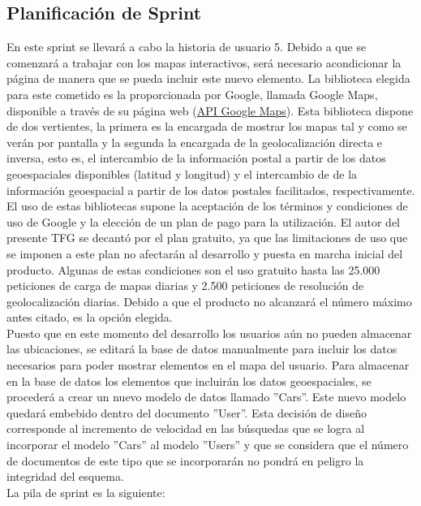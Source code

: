 	\subsection{Planificación de Sprint}
	En este sprint se llevará a cabo la historia de usuario 5. Debido a que se comenzará a trabajar con los mapas interactivos, será necesario acondicionar la página de manera que se pueda incluir este nuevo elemento. La biblioteca elegida para este cometido es la proporcionada por Google, llamada Google Maps, disponible a través de su página web (\href{https://developers.google.com/maps/?hl=es}{API Google Maps}). Esta biblioteca dispone de dos vertientes, la primera es la encargada de mostrar los mapas tal y como se verán por pantalla y la segunda la encargada de la geolocalización directa e inversa, esto es, el intercambio de la información postal a partir de los datos geoespaciales disponibles (latitud y longitud) y el intercambio de de la información geoespacial a partir de los datos postales facilitados, respectivamente. El uso de estas bibliotecas supone la aceptación de los términos y condiciones de uso de Google y la elección de un plan de pago para la utilización. El autor del presente TFG se decantó por el plan gratuito, ya que las limitaciones de uso que se imponen a este plan no afectarán al desarrollo y puesta en marcha inicial del producto. Algunas de estas condiciones son el uso gratuito hasta las 25.000 peticiones de carga de mapas diarias y 2.500 peticiones de resolución de geolocalización diarias. Debido a que el producto no alcanzará el número máximo antes citado, es la opción elegida.\\
	Puesto que en este momento del desarrollo los usuarios aún no pueden almacenar las ubicaciones, se editará la base de datos manualmente para incluir los datos necesarios para poder mostrar elementos en el mapa del usuario. Para almacenar en la base de datos los elementos que incluirán los datos geoespaciales, se procederá a crear un nuevo modelo de datos llamado ''Cars''. Este nuevo modelo quedará embebido dentro del documento ''User''. Esta decisión de diseño corresponde al incremento de velocidad en las búsquedas que se logra al incorporar el modelo ''Cars'' al modelo ''Users'' y que se considera que el número de documentos de este tipo que se incorporarán no pondrá en peligro la integridad del esquema.\\
	La pila de sprint es la siguiente:\\

